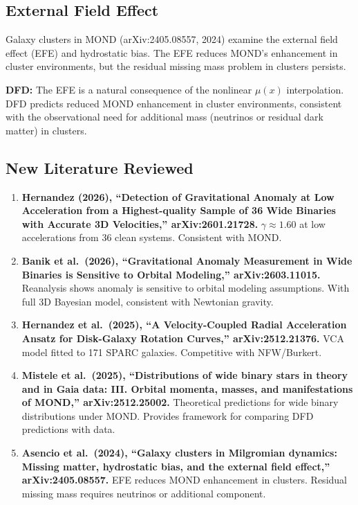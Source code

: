 \documentclass[11pt]{article}
\begin{document}
\subsection{External Field Effect}

Galaxy clusters in MOND (arXiv:2405.08557, 2024) examine the
external field effect (EFE) and hydrostatic bias. The EFE reduces
MOND's enhancement in cluster environments, but the residual missing
mass problem in clusters persists.

\textbf{DFD:} The EFE is a natural consequence of the nonlinear
$\mu(x)$ interpolation. DFD predicts reduced MOND enhancement in
cluster environments, consistent with the observational need for
additional mass (neutrinos or residual dark matter) in clusters.

\subsection{New Literature Reviewed}

\begin{tcolorbox}[colback=green!5!white, colframe=green!50!black,
  title=\textbf{Agent 14: NEW LITERATURE REVIEWED}]

\begin{enumerate}

\item \textbf{Hernandez (2026), ``Detection of Gravitational Anomaly
  at Low Acceleration from a Highest-quality Sample of 36 Wide Binaries
  with Accurate 3D Velocities,'' arXiv:2601.21728.}
  $\gamma \approx 1.60$ at low accelerations from 36 clean systems.
  Consistent with MOND.

\item \textbf{Banik et al.\ (2026), ``Gravitational Anomaly
  Measurement in Wide Binaries is Sensitive to Orbital Modeling,''
  arXiv:2603.11015.}
  Reanalysis shows anomaly is sensitive to orbital modeling
  assumptions. With full 3D Bayesian model, consistent with
  Newtonian gravity.

\item \textbf{Hernandez et al.\ (2025), ``A Velocity-Coupled
  Radial Acceleration Ansatz for Disk-Galaxy Rotation Curves,''
  arXiv:2512.21376.}
  VCA model fitted to 171 SPARC galaxies. Competitive with NFW/Burkert.

\item \textbf{Mistele et al.\ (2025), ``Distributions of wide binary
  stars in theory and in Gaia data: III. Orbital momenta, masses,
  and manifestations of MOND,'' arXiv:2512.25002.}
  Theoretical predictions for wide binary distributions under MOND.
  Provides framework for comparing DFD predictions with data.

\item \textbf{Asencio et al.\ (2024), ``Galaxy clusters in
  Milgromian dynamics: Missing matter, hydrostatic bias, and the
  external field effect,'' arXiv:2405.08557.}
  EFE reduces MOND enhancement in clusters. Residual missing mass
  requires neutrinos or additional component.

\end{enumerate}
\end{tcolorbox}
\end{document}
